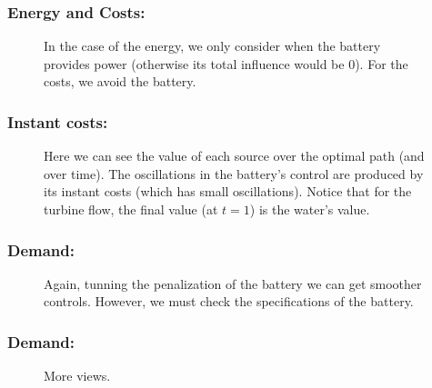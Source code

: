 \documentclass[aspectratio=169]{beamer}\usepackage[utf8]{inputenc}
\begin{document}
\begin{frame}\frametitle{Energy and Costs:}
\begin{figure}[ht!]
\centering
{}
\caption{In the case of the energy, we only consider when the battery provides power (otherwise its total influence would be 0). For the costs, we avoid the battery.}
\end{figure}
\end{frame}

\begin{frame}\frametitle{Instant costs:}
\begin{figure}[ht!]
\centering
{}
\caption{Here we can see the value of each source over the optimal path (and over time). The oscillations in the battery's control are produced by its instant costs (which has small oscillations). Notice that for the turbine flow, the final value (at $t=1$) is the water's value.}
\end{figure}
\end{frame}

\begin{frame}\frametitle{Demand:}
\begin{figure}[ht!]
\centering
{}
\caption{Again, tunning the penalization of the battery we can get smoother controls. However, we must check the specifications of the battery.}
\end{figure}
\end{frame}

\begin{frame}\frametitle{Demand:}
\begin{figure}[ht!]
\centering
{}
\caption{More views.}
\end{figure}
\end{frame}
\end{document}
